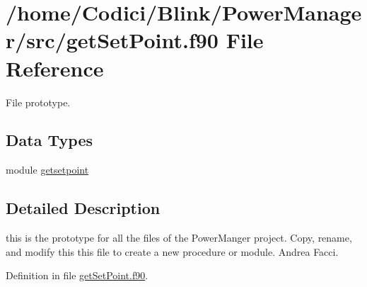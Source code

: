 \hypertarget{get_set_point_8f90}{\section{/home/\-Codici/\-Blink/\-Power\-Manager/src/get\-Set\-Point.f90 File Reference}
\label{get_set_point_8f90}
}


File prototype.  


\subsection*{Data Types}
\begin{DoxyCompactItemize}
\item 
module \hyperlink{classgetsetpoint}{getsetpoint}
\end{DoxyCompactItemize}


\subsection{Detailed Description}
this is the prototype for all the files of the Power\-Manger project. Copy, rename, and modify this this file to create a new procedure or module.  Andrea Facci. 

Definition in file \hyperlink{get_set_point_8f90_source}{get\-Set\-Point.\-f90}.


